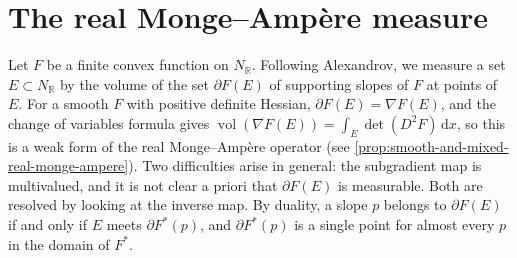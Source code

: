 \section{The real Monge--Amp\`ere measure}
\label{sec:real-monge-ampere-measure}
Let $F$ be a finite convex function on $N_{\mathbb R}$. Following Alexandrov, we measure a set $E\subset N_{\mathbb R}$ by the volume of the set $\partial F(E)$ of supporting slopes of $F$ at points of $E$. For a smooth $F$ with positive definite Hessian, $\partial F(E)=\nabla F(E)$, and the change of variables formula gives $\operatorname{vol}(\nabla F(E))=\int_E\det(D^2F)\,\mathrm dx$, so this is a weak form of the real Monge--Amp\`ere operator (see \cref{prop:smooth-and-mixed-real-monge-ampere}). Two difficulties arise in general: the subgradient map is multivalued, and it is not clear a priori that $\partial F(E)$ is measurable. Both are resolved by looking at the inverse map. By duality, a slope $p$ belongs to $\partial F(E)$ if and only if $E$ meets $\partial F^*(p)$, and $\partial F^*(p)$ is a single point for almost every $p$ in the domain of $F^*$.

